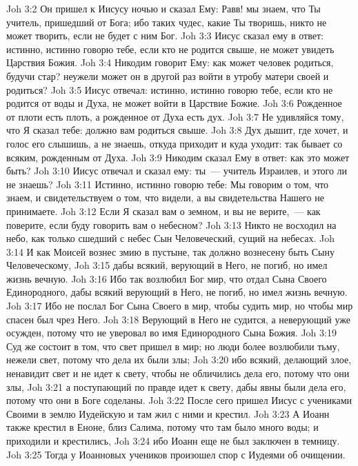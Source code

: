 \vs Joh 3:2 Он пришел к Иисусу ночью и сказал Ему: Равв! мы знаем, что Ты учитель, пришедший от Бога; ибо таких чудес, какие Ты творишь, никто не может творить, если не будет с ним Бог.
\vs Joh 3:3 Иисус сказал ему в ответ: истинно, истинно говорю тебе, если кто не родится свыше, не может увидеть Царствия Божия.
\vs Joh 3:4 Никодим говорит Ему: как может человек родиться, будучи стар? неужели может он в другой раз войти в утробу матери своей и родиться?
\vs Joh 3:5 Иисус отвечал: истинно, истинно говорю тебе, если кто не родится от воды и Духа, не может войти в Царствие Божие.
\vs Joh 3:6 Рожденное от плоти есть плоть, а рожденное от Духа есть дух.
\vs Joh 3:7 Не удивляйся тому, что Я сказал тебе: должно вам родиться свыше.
\vs Joh 3:8 Дух дышит, где хочет, и голос его слышишь, а не знаешь, откуда приходит и куда уходит: так бывает со всяким, рожденным от Духа.
\vs Joh 3:9 Никодим сказал Ему в ответ: как это может быть?
\vs Joh 3:10 Иисус отвечал и сказал ему: ты~--- учитель Израилев, и этого ли не знаешь?
\vs Joh 3:11 Истинно, истинно говорю тебе: Мы говорим о том, что знаем, и свидетельствуем о том, что видели, а вы свидетельства Нашего не принимаете.
\vs Joh 3:12 Если Я сказал вам о земном, и вы не верите,~--- как поверите, если буду говорить вам о небесном?
\vs Joh 3:13 Никто не восходил на небо, как только сшедший с небес Сын Человеческий, сущий на небесах.
\vs Joh 3:14 И как Моисей вознес змию в пустыне, так должно вознесену быть Сыну Человеческому,
\vs Joh 3:15 дабы всякий, верующий в Него, не погиб, но имел жизнь вечную.
\vs Joh 3:16 Ибо так возлюбил Бог мир, что отдал Сына Своего Единородного, дабы всякий верующий в Него, не погиб, но имел жизнь вечную.
\vs Joh 3:17 Ибо не послал Бог Сына Своего в мир, чтобы судить мир, но чтобы мир спасен был чрез Него.
\vs Joh 3:18 Верующий в Него не судится, а неверующий уже осужден, потому что не уверовал во имя Единородного Сына Божия.
\vs Joh 3:19 Суд же состоит в том, что свет пришел в мир; но люди более возлюбили тьму, нежели свет, потому что дела их были злы;
\vs Joh 3:20 ибо всякий, делающий злое, ненавидит свет и не идет к свету, чтобы не обличились дела его, потому что они злы,
\vs Joh 3:21 а поступающий по правде идет к свету, дабы явны были дела его, потому что они в Боге соделаны.
\rsbpar\vs Joh 3:22 После сего пришел Иисус с учениками Своими в землю Иудейскую и там жил с ними и крестил.
\vs Joh 3:23 А Иоанн также крестил в Еноне, близ Салима, потому что там было много воды; и приходили  и крестились,
\vs Joh 3:24 ибо Иоанн еще не был заключен в темницу.
\vs Joh 3:25 Тогда у Иоанновых учеников произошел спор с Иудеями об очищении.
